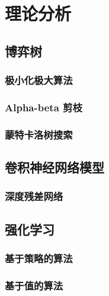 \chapter{理论分析}
\label{chap:theory}

\section{博弈树}

\subsection{极小化极大算法}

\subsection{Alpha-beta 剪枝}

\subsection{蒙特卡洛树搜索}

\section{卷积神经网络模型}

\subsection{深度残差网络}

\section{强化学习}

\subsection{基于策略的算法}

\subsection{基于值的算法}